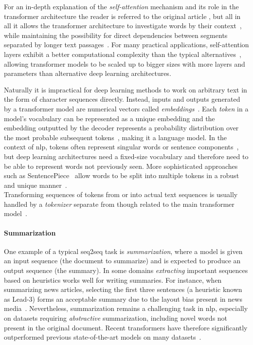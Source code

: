 For an in-depth explanation of the \emph{self-attention} mechanism
and its role in the transformer architecture the reader is referred to the original article \parencite{transformer},
but all in all it allows the transformer architecture to investigate words by their context~\parencite[25]{practical_nlp},
while maintaining the possibility for direct dependencies between segments separated by longer text passages~\parencite[6]{transformer}.
For many practical applications, self-attention layers exhibit a better computational complexity than the typical alternatives~\parencite[6-7]{transformer},
allowing transformer models to be scaled up to bigger sizes with more layers and parameters than alternative deep learning architectures.

Naturally it is impractical for deep learning methods to work on arbitrary text in the form of character sequences directly.
Instead, inputs and outputs generated by a transformer model are numerical vectors called \emph{embeddings}~\parencite[5-6]{transformer}.
Each \emph{token} in a model's vocabulary can be represented as a unique embedding
and the embedding outputted by the decoder represents a probability distribution over the most probable subsequent tokens~\parencite[5]{transformer},
making it a language model.
In the context of \ac{nlp}, tokens often represent singular words or sentence components~\parencite[124]{statistical_nlp},
but deep learning architectures need a fixed-size vocabulary and therefore need to be able to represent words not previously seen.
More sophisticated approaches such as SentencePiece~\parencite{sentencepiece}
allow words to be split into multiple tokens in a robust and unique manner~\parencite{subword_sentencepiece}.\\
Transforming sequences of tokens from or into actual text sequences is usually handled by a \emph{tokenizer} separate from though related to the main transformer model~\parencite[41]{huggingface_transformers}.

\paragraph{Summarization}

One example of a typical \acl{seq2seq} task is \emph{summarization},
where a model is given an input sequence (the document to summarize) and is expected to produce an output sequence (the summary).
In some domains \emph{extracting} important sequences based on heuristics works well for writing summaries.
For instance, when summarizing news articles,
selecting the first three sentences (a heuristic known as Lead-3) forms an acceptable summary due to the layout bias present in news media~\parencites{summarization_critical_evaluation}.
Nevertheless, summarization remains a challenging task in \ac{nlp},
especially on datasets requiring \emph{abstractive} summarization,
including novel words not present in the original document.
Recent transformers have therefore significantly outperformed previous state-of-the-art models on many datasets~\parencites{bart}{pegasus}.

